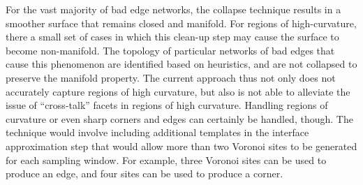 For the vast majority of bad edge networks, the collapse technique results in a smoother surface that remains closed and manifold. For regions of high-curvature, there a small set of cases in which this clean-up step may cause the surface to become non-manifold. The topology of particular networks of bad edges that cause this phenomenon are identified based on heuristics, and are not collapsed to preserve the manifold property. The current approach thus not only does not accurately capture regions of high curvature, but also is not able to alleviate the issue of ``cross-talk'' facets in regions of high curvature. Handling regions of curvature or even sharp corners and edges can certainly be handled, though. The technique would involve including additional templates in the interface approximation step that would allow more than two Voronoi sites to be generated for each sampling window. For example, three Voronoi sites can be used to produce an edge, and four sites can be used to produce a corner.

